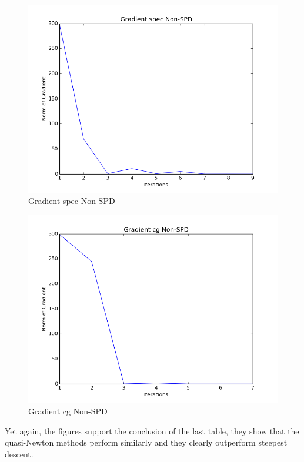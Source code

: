 \documentclass{article}
\begin{document}
\begin{figure}[H]
  \centering
  \includegraphics[scale=0.5]{specnspd.png}
  \caption{Gradient spec Non-SPD}
\end{figure}
\begin{figure}[H]
  \centering
  \includegraphics[scale=0.5]{cgnspd.png}
  \caption{Gradient cg Non-SPD}
\end{figure}
Yet again, the figures support the conclusion of the last table, they show that the quasi-Newton methods perform
similarly and they clearly outperform steepest descent.
\end{document}
